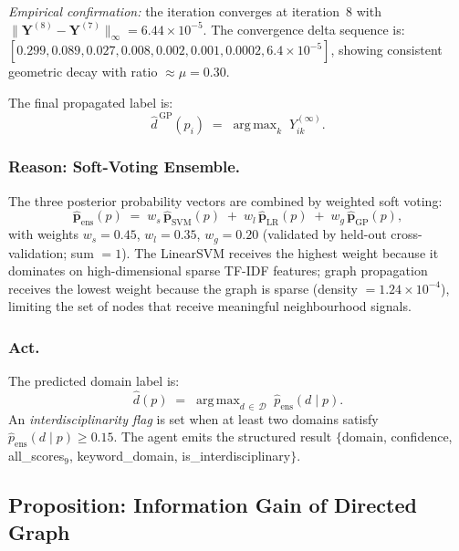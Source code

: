 \documentclass[letterpaper]{article}
\theoremstyle{plain}
\theoremstyle{definition}
\theoremstyle{remark}
\newcommand{\D}{\mathcal{D}}
\newcommand{\Y}{\mathbf{Y}}
\DeclareMathOperator*{\argmax}{arg\,max}
\begin{document}
\noindent
\textit{Empirical confirmation:}
the iteration converges at iteration~8 with
$\|\Y^{(8)} - \Y^{(7)}\|_\infty = 6.44 \times 10^{-5}$.
The convergence delta sequence is:
$[0.299, 0.089, 0.027, 0.008, 0.002, 0.001, 0.0002, 6.4 \times 10^{-5}]$,
showing consistent geometric decay with ratio $\approx \mu = 0.30$.

\noindent
The final propagated label is:
\begin{equation}
    \hat{d}^{\,\mathrm{GP}}(p_i)
    \;=\;
    \argmax_{k}\; Y^{(\infty)}_{ik}.
    \label{eq:gpfinal}
\end{equation}

\subsubsection{Reason: Soft-Voting Ensemble.}
The three posterior probability vectors are combined by
weighted soft voting:
\begin{equation}
    \hat{\mathbf{p}}_{\mathrm{ens}}(p)
    \;=\;
    w_s\,\hat{\mathbf{p}}_{\mathrm{SVM}}(p)
    \;+\;
    w_l\,\hat{\mathbf{p}}_{\mathrm{LR}}(p)
    \;+\;
    w_g\,\hat{\mathbf{p}}_{\mathrm{GP}}(p),
    \label{eq:ensemble}
\end{equation}
with weights $w_s = 0.45$, $w_l = 0.35$, $w_g = 0.20$
(validated by held-out cross-validation;
sum $= 1$).
The LinearSVM receives the highest weight because it
dominates on high-dimensional sparse TF-IDF features;
graph propagation receives the lowest weight because
the graph is sparse (density $= 1.24 \times 10^{-4}$),
limiting the set of nodes that receive meaningful
neighbourhood signals.

\subsubsection{Act.}
The predicted domain label is:
\begin{equation}
    \hat{d}(p)
    \;=\;
    \argmax_{d \,\in\, \D}\;
    \hat{p}_{\mathrm{ens}}(d \mid p).
    \label{eq:predict}
\end{equation}
An \emph{interdisciplinarity flag} is set when at least
two domains satisfy
$\hat{p}_{\mathrm{ens}}(d \mid p) \geq 0.15$.
The agent emits the structured result
$\{$domain, confidence, all\_scores$_{9}$,
keyword\_domain, is\_interdisciplinary$\}$.

\subsection{Proposition: Information Gain of Directed Graph}
\label{sec:infogain}
\end{document}
